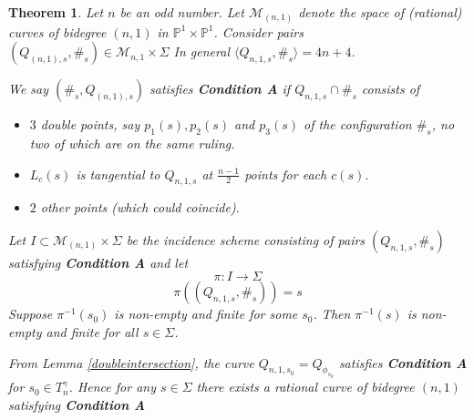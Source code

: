 \documentclass[11pt,a4paper]{article}
\newtheorem{thm}[defn]{Theorem}
\newcommand {\M}{{\mathcal M}}
\newcommand {\CP}{{\mathds P}}
\newcommand {\CPP}{\CP^1 \times \CP^1}
\begin{document}
\begin{thm} Let $n$ be an odd number. Let $\M_{(n,1)}$ denote the  space of (rational) curves of bidegree $(n,1)$ in $\CPP$. Consider pairs $(Q_{(n,1),s},\#_s) \in \M_{n,1} \times \Sigma$   In general $\langle Q_{n,1,s},\#_s\rangle=4n+4$. 
  
 We say  $(\#_s,Q_{(n,1),s})$ satisfies {\bf Condition A} if $Q_{n,1,s} \cap \#_s$ consists of 
	
	\begin{itemize}
		\item  $3$  double points, say $p_1(s), p_2(s)$ and $p_3(s)$  of the configuration $\#_{s}$, no two of which are on the same ruling. 
		\item $L_c(s)$ is tangential to $Q_{n,1,s}$ at $\frac{n-1}{2}$ points for each $c(s)$. 
		\item $2$ other points (which could coincide). 
	\end{itemize}
Let $I \subset \M_{(n,1)} \times \Sigma$ be the incidence scheme consisting of pairs $(Q_{n,1,s},\#_s)$ satisfying {\bf Condition A} and let 
%
$$\pi:I \rightarrow \Sigma$$ 
$$\pi((Q_{n,1,s},\#_s))=s$$
%
Suppose $\pi^{-1}(s_0)$ is non-empty and finite for some $s_0$. Then $\pi^{-1}(s)$ is non-empty  and finite  for all $s \in \Sigma$.

From Lemma \ref{doubleintersection}, the curve $Q_{n,1,s_0}=Q_{\phi_{s_0}}$ satisfies {\bf Condition A} for $s_0\in T^{\gamma}_n$. Hence for any $s\in \Sigma$ there  exists a rational curve of bidegree $(n,1)$ satisfying {\bf Condition A}
	
	
	
\label{enumgeom}
\end{thm}
\end{document}
